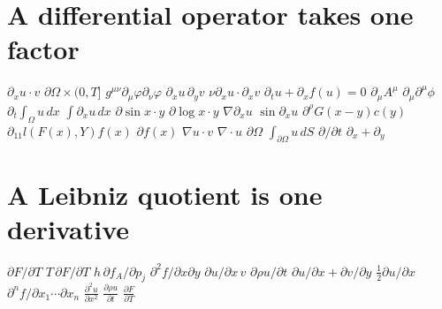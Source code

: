 \documentclass{article}
\begin{document}
\section{A differential operator takes one factor}
$\partial_x u\cdot v$ $\partial\Omega\times(0,T]$ $g^{\mu\nu}\partial_\mu\varphi\partial_\nu\varphi$ $\partial_x u\,\partial_y v$
$\nu\partial_x u\cdot\partial_x v$ $\partial_t u+\partial_x f(u)=0$ $\partial_\mu A^\mu$ $\partial_\mu\partial^\mu\phi$
$\partial_t\int_\Omega u\,dx$ $\int\partial_x u\,dx$ $\partial\sin x\cdot y$ $\partial\log x\cdot y$ $\nabla\partial_x u$
$\sin\partial_x u$ $\partial^\rho G(x-y)c(y)$ $\partial_{11}l(F(x),Y)f(x)$ $\partial f(x)$ $\nabla u\cdot v$
$\nabla\cdot u$ $\partial\Omega$ $\int_{\partial\Omega}u\,dS$ $\partial/\partial t$ $\partial_x+\partial_y$

\section{A Leibniz quotient is one derivative}
$\partial F/\partial T$ $T\,\partial F/\partial T$ $h\,\partial f_{A}/\partial p_{j}$ $\partial^2 f/\partial x\partial y$
$\partial u/\partial x\,v$ $\partial\rho u/\partial t$ $\partial u/\partial x+\partial v/\partial y$ $\frac12\partial u/\partial x$
$\partial^n f/\partial x_1\cdots\partial x_n$ $\frac{\partial^2 u}{\partial x^2}$ $\frac{\partial\rho u}{\partial t}$
$\frac{\partial F}{\partial T}$

\end{document}
